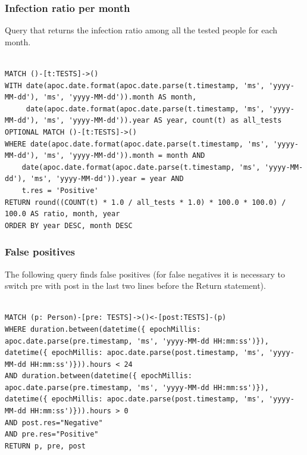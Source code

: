 \documentclass{article}
\begin{document}
\subsubsection{Infection ratio per month}
Query that returns the infection ratio among all the tested people for each month.
\begin{lstlisting}[language=cypher, label=lst:cypher-example]

MATCH ()-[t:TESTS]->()
WITH date(apoc.date.format(apoc.date.parse(t.timestamp, 'ms', 'yyyy-MM-dd'), 'ms', 'yyyy-MM-dd')).month AS month,
     date(apoc.date.format(apoc.date.parse(t.timestamp, 'ms', 'yyyy-MM-dd'), 'ms', 'yyyy-MM-dd')).year AS year, count(t) as all_tests
OPTIONAL MATCH ()-[t:TESTS]->()
WHERE date(apoc.date.format(apoc.date.parse(t.timestamp, 'ms', 'yyyy-MM-dd'), 'ms', 'yyyy-MM-dd')).month = month AND
    date(apoc.date.format(apoc.date.parse(t.timestamp, 'ms', 'yyyy-MM-dd'), 'ms', 'yyyy-MM-dd')).year = year AND
    t.res = 'Positive'
RETURN round((COUNT(t) * 1.0 / all_tests * 1.0) * 100.0 * 100.0) / 100.0 AS ratio, month, year
ORDER BY year DESC, month DESC
\end{lstlisting}
\subsubsection{False positives}

The following query finds false positives (for false negatives it is necessary to switch pre with post in the last two lines before the Return statement).
\begin{lstlisting}[language=cypher, label=lst:cypher-example]

MATCH (p: Person)-[pre: TESTS]->()<-[post:TESTS]-(p)
WHERE duration.between(datetime({ epochMillis: apoc.date.parse(pre.timestamp, 'ms', 'yyyy-MM-dd HH:mm:ss')}), datetime({ epochMillis: apoc.date.parse(post.timestamp, 'ms', 'yyyy-MM-dd HH:mm:ss')})).hours < 24
AND duration.between(datetime({ epochMillis: apoc.date.parse(pre.timestamp, 'ms', 'yyyy-MM-dd HH:mm:ss')}), datetime({ epochMillis: apoc.date.parse(post.timestamp, 'ms', 'yyyy-MM-dd HH:mm:ss')})).hours > 0
AND post.res="Negative"
AND pre.res="Positive"
RETURN p, pre, post
\end{lstlisting}
\end{document}

